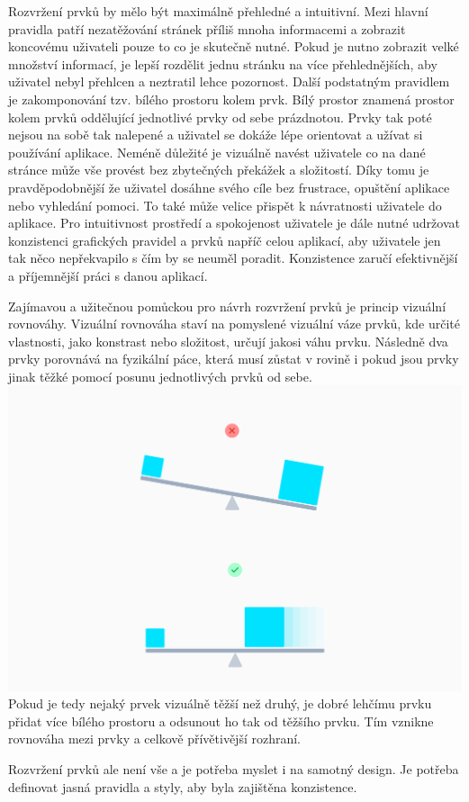 \begin{itemize}
\begin{itemize}
		Rozvržení prvků by mělo být maximálně přehledné a intuitivní.
		Mezi hlavní pravidla patří nezatěžování stránek příliš mnoha informacemi a zobrazit koncovému uživateli pouze to
		co je skutečně nutné.
		Pokud je nutno zobrazit velké množství informací, je lepší rozdělit jednu stránku na více přehlednějších, aby
		uživatel nebyl přehlcen a neztratil lehce pozornost.
		Další podstatným pravidlem je zakomponování tzv. bílého prostoru kolem prvk.
		Bílý prostor znamená prostor kolem prvků oddělující jednotlivé prvky od sebe prázdnotou.
		Prvky tak poté nejsou na sobě tak nalepené a uživatel se dokáže lépe orientovat a užívat si používání aplikace.
		Neméně důležité je vizuálně navést uživatele co na dané stránce může vše provést bez zbytečných překážek a
		složitostí.
		Díky tomu je pravděpodobnější že uživatel dosáhne svého cíle bez frustrace, opuštění aplikace nebo vyhledání
		pomoci.
		To také může velice přispět k návratnosti uživatele do aplikace.
		Pro intuitivnost prostředí a spokojenost uživatele je dále nutné udržovat konzistenci grafických pravidel a prvků
		napříč celou aplikací, aby uživatele jen tak něco nepřekvapilo s čím by se neuměl poradit.
		Konzistence zaručí efektivnější a příjemnější práci s danou aplikací.
		\cite{create_great_ux}

		Zajímavou a užitečnou pomůckou pro návrh rozvržení prvků je princip vizuální rovnováhy.
		Vizuální rovnováha staví na pomyslené vizuální váze prvků, kde určité vlastnosti, jako konstrast nebo složitost,
		určují jakosi váhu prvku.
		Následně dva prvky porovnává na fyzikální páce, která musí zůstat v rovině i pokud jsou prvky jinak těžké pomocí
		posunu jednotlivých prvků od sebe.
		\includegraphics[width=0.24\linewidth]{obrazky/rovnovaha_paka.png}\hfill
		Pokud je tedy nejaký prvek vizuálně těžší než druhý, je dobré lehčímu prvku přidat více bílého prostoru a odsunout
		ho tak od těžšího prvku.
		Tím vznikne rovnováha mezi prvky a celkově přívětivější rozhraní.
		\cite{vizualni_rovnovaha}

		Rozvržení prvků ale není vše a je potřeba myslet i na samotný design.
		Je potřeba definovat jasná pravidla a styly, aby byla zajištěna konzistence.


\end{itemize}
\end{itemize}
